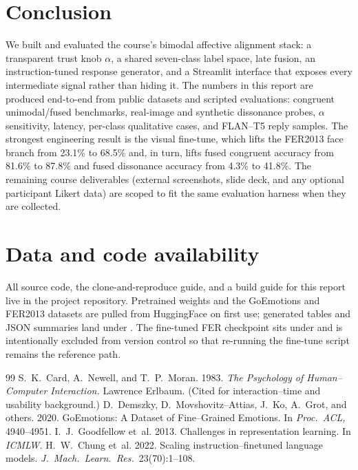 \documentclass[sigconf,nonacm]{acmart}
\begin{document}
\section{Conclusion}
We built and evaluated the course's bimodal affective alignment stack: a transparent trust knob $\alpha$, a shared seven-class label space, late fusion, an instruction-tuned response generator, and a Streamlit interface that exposes every intermediate signal rather than hiding it. The numbers in this report are produced end-to-end from public datasets and scripted evaluations: congruent unimodal/fused benchmarks, real-image and synthetic dissonance probes, $\alpha$ sensitivity, latency, per-class qualitative cases, and FLAN--T5 reply samples. The strongest engineering result is the visual fine-tune, which lifts the FER2013 face branch from 23.1\% to 68.5\% and, in turn, lifts fused congruent accuracy from 81.6\% to 87.8\% and fused dissonance accuracy from 4.3\% to 41.8\%. The remaining course deliverables (external screenshots, slide deck, and any optional participant Likert data) are scoped to fit the same evaluation harness when they are collected.

\section*{Data and code availability}
All source code, the  clone-and-reproduce guide, and a build guide for this report live in the project repository. Pretrained weights and the GoEmotions and FER2013 datasets are pulled from HuggingFace on first use; generated tables and JSON summaries land under . The fine-tuned FER checkpoint sits under  and is intentionally excluded from version control so that re-running the fine-tune script remains the reference path.

\balance
\begin{thebibliography}{99}
\sloppy\small
{} S.~K.~Card, A.~Newell, and T.~P.~Moran. 1983. \emph{The Psychology of Human--Computer Interaction.} Lawrence Erlbaum. (Cited for interaction--time and usability background.)
 D.~Demszky, D.~Movshovitz--Attias, J.~Ko, A.~Grot, and others. 2020. GoEmotions: A Dataset of Fine--Grained Emotions. In \emph{Proc.\ ACL,} 4940--4951.
 I.~J.~Goodfellow et~al. 2013. Challenges in representation learning. In \emph{ICMLW.}
 H.~W.~Chung et~al. 2022. Scaling instruction--finetuned language models. \emph{J.\ Mach.\ Learn.\ Res.}~23(70):1--108.
\end{thebibliography}
\end{document}

